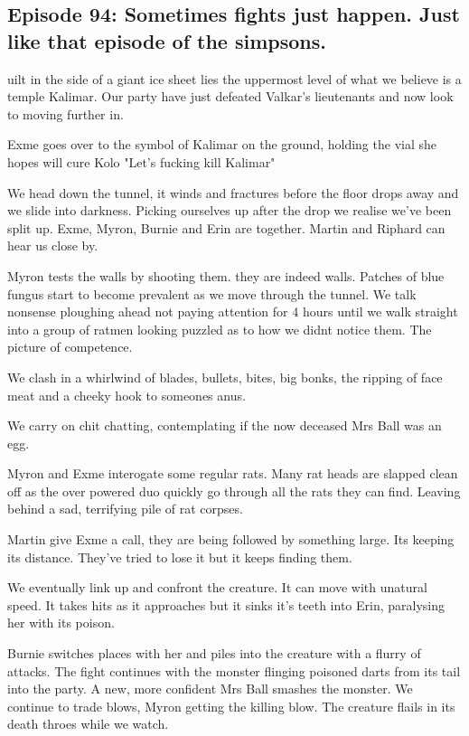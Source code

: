 \subsection{Episode 94: Sometimes fights just happen. Just like that episode of the simpsons.}

uilt in the side of a giant ice sheet lies the uppermost level of what we believe is a temple Kalimar. Our party have just defeated Valkar's lieutenants and now look to moving further in.\medskip

Exme goes over to the symbol of Kalimar on the ground, holding the vial she hopes will cure Kolo "Let's fucking kill Kalimar"\medskip

We head down the tunnel, it winds and fractures before the floor drops away and we slide into darkness. Picking ourselves up after the drop we realise we've been split up. Exme, Myron, Burnie and Erin are together. Martin and Riphard can hear us close by.\medskip

Myron tests the walls by shooting them. they are indeed walls. Patches of blue fungus start to become prevalent as we move through the tunnel. We talk nonsense ploughing ahead not paying attention for 4 hours until we walk straight into a group of ratmen looking puzzled as to how we didnt notice them. The picture of competence.\medskip

We clash in a whirlwind of blades, bullets, bites, big bonks, the ripping of face meat and a cheeky hook to someones anus.\medskip

We carry on chit chatting, contemplating if the now deceased Mrs Ball was an egg.\medskip

Myron and Exme interogate some regular rats. Many rat heads are slapped clean off as the over powered duo quickly go through all the rats they can find. Leaving behind a sad, terrifying pile of rat corpses.\medskip

Martin give Exme a call, they are being followed by something large. Its keeping its distance. They've tried to lose it but it keeps finding them.\medskip

We eventually link up and confront the creature. It can move with unatural speed. It takes hits as it approaches but it sinks it's teeth into Erin, paralysing her with its poison.\medskip

Burnie switches places with her and piles into the creature with a flurry of attacks. The fight continues with the monster flinging poisoned darts from its tail into the party. A new, more confident Mrs Ball smashes the monster. We continue to trade blows, Myron getting the killing blow. The creature flails in its death throes while we watch.\medskip

\vspace*{5mm}
